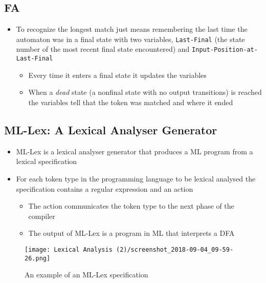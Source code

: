 \documentclass[11pt]{article}
\begin{document}
\subsection{FA}
\label{sec:org27073a2}
\begin{itemize}
\item To recognize the longest match just means remembering the last time the automaton was in a final state with two variables, \texttt{Last-Final} (the state number of the most recent final state encountered) and \texttt{Input-Position-at-Last-Final}
\begin{itemize}
\item Every time it enters a final state it updates the variables
\item When a \emph{dead} state (a nonfinal state with no output transitions) is reached the variables tell that the token was matched and where it ended
\end{itemize}
\end{itemize}

\subsection{ML-Lex: A Lexical Analyser Generator}
\label{sec:org39904be}
\begin{itemize}
\item ML-Lex is a lexical analyser generator that produces a ML program from a lexical specification

\item For each token type in the programming language to be lexical analysed the specification contains a regular expression and an action
\begin{itemize}
\item The action communicates the token type to the next phase of the compiler
\item The output of ML-Lex is a program in ML that interprets a DFA
\end{itemize}
\end{itemize}

\begin{figure}[htbp]
\centering
\texttt{[image: Lexical Analysis (2)/screenshot\_2018-09-04\_09-59-26.png]}
\caption{\label{fig:org49af8c4}
An example of an ML-Lex specification}
\end{figure}
\end{document}
